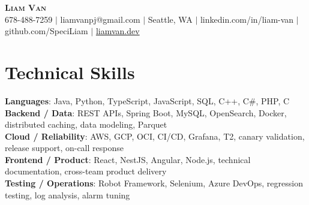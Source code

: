 \documentclass[letterpaper,11pt]{article}
\begin{document}

%
\begin{center}
    \textbf{\Huge \scshape Liam Van} \\ \vspace{1pt}
    \small 678-488-7259 $|$ liamvanpj@gmail.com $|$ Seattle, WA $|$
    linkedin.com/in/liam-van $|$ github.com/SpeciLiam $|$ \href{https://liamvan.dev}{liamvan.dev}

\end{center}

\section{Technical Skills}
 \begin{itemize}[leftmargin=0.15in, label={}]
    \small{\item{
     \textbf{Languages}{: Java, Python, TypeScript, JavaScript, SQL, C++, C\#, PHP, C} \\
     \textbf{Backend / Data}{: REST APIs, Spring Boot, MySQL, OpenSearch, Docker, distributed caching, data modeling, Parquet} \\
     \textbf{Cloud / Reliability}{: AWS, GCP, OCI, CI/CD, Grafana, T2, canary validation, release support, on-call response} \\
     \textbf{Frontend / Product}{: React, NestJS, Angular, Node.js, technical documentation, cross-team product delivery} \\
     \textbf{Testing / Operations}{: Robot Framework, Selenium, Azure DevOps, regression testing, log analysis, alarm tuning} \\
    }}
 \end{itemize}
%
\end{document}
